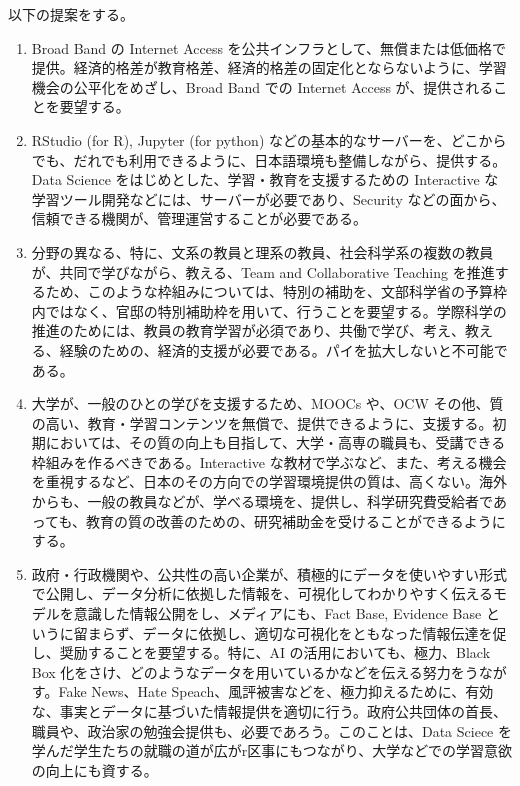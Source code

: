 \documentclass[
]{bxjsbook}
\theoremstyle{definition}
\theoremstyle{definition}
\theoremstyle{definition}
\theoremstyle{definition}
\theoremstyle{remark}
\begin{document}
以下の提案をする。

\begin{enumerate}
\def\labelenumi{\arabic{enumi}.}
\item
  Broad Band の Internet Access を公共インフラとして、無償または低価格で提供。経済的格差が教育格差、経済的格差の固定化とならないように、学習機会の公平化をめざし、Broad Band での Internet Access が、提供されることを要望する。
\item
  RStudio (for R), Jupyter (for python) などの基本的なサーバーを、どこからでも、だれでも利用できるように、日本語環境も整備しながら、提供する。Data Science をはじめとした、学習・教育を支援するための Interactive な学習ツール開発などには、サーバーが必要であり、Security などの面から、信頼できる機関が、管理運営することが必要である。
\item
  分野の異なる、特に、文系の教員と理系の教員、社会科学系の複数の教員が、共同で学びながら、教える、Team and Collaborative Teaching を推進するため、このような枠組みについては、特別の補助を、文部科学省の予算枠内ではなく、官邸の特別補助枠を用いて、行うことを要望する。学際科学の推進のためには、教員の教育学習が必須であり、共働で学び、考え、教える、経験のための、経済的支援が必要である。パイを拡大しないと不可能である。
\item
  大学が、一般のひとの学びを支援するため、MOOCs や、OCW その他、質の高い、教育・学習コンテンツを無償で、提供できるように、支援する。初期においては、その質の向上も目指して、大学・高専の職員も、受講できる枠組みを作るべきである。Interactive な教材で学ぶなど、また、考える機会を重視するなど、日本のその方向での学習環境提供の質は、高くない。海外からも、一般の教員などが、学べる環境を、提供し、科学研究費受給者であっても、教育の質の改善のための、研究補助金を受けることができるようにする。
\item
  政府・行政機関や、公共性の高い企業が、積極的にデータを使いやすい形式で公開し、データ分析に依拠した情報を、可視化してわかりやすく伝えるモデルを意識した情報公開をし、メディアにも、Fact Base, Evidence Base というに留まらず、データに依拠し、適切な可視化をともなった情報伝達を促し、奨励することを要望する。特に、AI の活用においても、極力、Black Box 化をさけ、どのようなデータを用いているかなどを伝える努力をうながす。Fake News、Hate Speach、風評被害などを、極力抑えるために、有効な、事実とデータに基づいた情報提供を適切に行う。政府公共団体の首長、職員や、政治家の勉強会提供も、必要であろう。このことは、Data Sciece を学んだ学生たちの就職の道が広がr区事にもつながり、大学などでの学習意欲の向上にも資する。
\end{enumerate}
\end{document}
